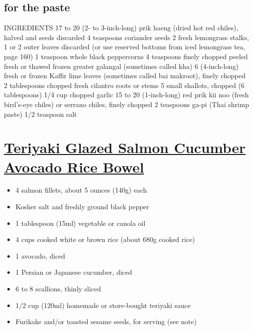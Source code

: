 \documentclass[]{article}
\providecommand{\tightlist}{%
  \setlength{\itemsep}{0pt}\setlength{\parskip}{0pt}}
\begin{document}
\hypertarget{for-the-paste}{%
\subsection{for the paste}\label{for-the-paste}}

INGREDIENTS
17 to 20 (2- to 3-inch-long) prik haeng (dried hot red chiles), halved and seeds discarded
4 teaspoons coriander seeds
2 fresh lemongrass stalks, 1 or 2 outer leaves discarded (or use reserved bottoms from iced lemongrass tea, page 160)
1 teaspoon whole black peppercorns
4 teaspoons finely chopped peeled fresh or thawed frozen greater galangal (sometimes called kha)
6 (4-inch-long) fresh or frozen Kaffir lime leaves (sometimes called bai makroot), finely chopped
2 tablespoons chopped fresh cilantro roots or stems
5 small shallots, chopped (6 tablespoons)
1/4 cup chopped garlic
15 to 20 (1-inch-long) red prik kii noo (fresh bird's-eye chiles) or serrano chiles, finely chopped
2 teaspoons ga-pi (Thai shrimp paste)
1/2 teaspoon salt

\hypertarget{teriyaki-glazed-salmon-cucumber-avocado-rice-bowel}{%
\section{\texorpdfstring{\href{https://www.seriouseats.com/recipes/2016/07/easy-teriyaki-glazed-salmon-cucumber-avocado-rice-bowl-recipe.html}{Teriyaki Glazed Salmon Cucumber Avocado Rice Bowel}}{Teriyaki Glazed Salmon Cucumber Avocado Rice Bowel}}\label{teriyaki-glazed-salmon-cucumber-avocado-rice-bowel}}

\begin{itemize}
\tightlist
\item
  4 salmon fillets, about 5 ounces (140g) each
\item
  Kosher salt and freshly ground black pepper
\item
  1 tablespoon (15ml) vegetable or canola oil
\item
  4 cups cooked white or brown rice (about 680g cooked rice)
\item
  1 avocado, diced
\item
  1 Persian or Japanese cucumber, diced
\item
  6 to 8 scallions, thinly sliced
\item
  1/2 cup (120ml) homemade or store-bought teriyaki sauce
\item
  Furikake and/or toasted sesame seeds, for serving (see note)
\end{itemize}
\end{document}
